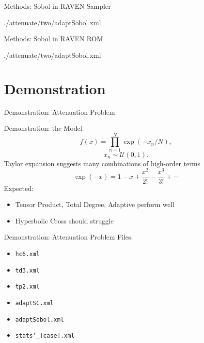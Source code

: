 \documentclass[t,9pt,svgnames]{beamer}
\newcommand{\code}[1]{\texttt{#1}}
\begin{document}
\begin{frame}{Methods: Sobol in RAVEN}
  \vfill
  Sampler
  
          {./attenuate/two/adaptSobol.xml}
  \vfill
\end{frame}

\begin{frame}{Methods: Sobol in RAVEN}
  \vfill
  ROM
  
          {./attenuate/two/adaptSobol.xml}
  \vfill
\end{frame}
%
%
\section{Demonstration}
\begin{frame}{Demonstration: Attenuation Problem}
\end{frame}

\begin{frame}{Demonstration: the Model}
  \vfill
  \begin{equation}
    f(x) = \prod_{n=1}^N \exp(-x_n/N),
  \end{equation}
  \vfill
  \begin{equation}
    x_n \sim \mathcal{U}(0,1).
  \end{equation}
  \vfill
  Taylor expansion suggests many combinations of high-order terms
  \begin{equation}
    \exp(-x) = 1-x+\frac{x^2}{2!}-\frac{x^3}{3!}+\cdots
  \end{equation}
  \vfill
  Expected: 
  \vfill
  \begin{itemize}
  \vfill
    \item Tensor Product, Total Degree, Adaptive perform well
  \vfill
    \item Hyperbolic Cross should struggle
  \end{itemize}
  \vfill
\end{frame}

\begin{frame}{Demonstration: Attenuation Problem}
  \vfill
  Files:
  \vfill
  \begin{itemize}
    \item \code{hc6.xml}
  \vfill
    \item \code{td3.xml}
  \vfill
    \item \code{tp2.xml}
  \vfill
    \item \code{adaptSC.xml}
  \vfill
    \item \code{adaptSobol.xml}
  \vfill
    \item \code{stats\char`_[case].xml}
  \end{itemize}
  \vfill
\end{frame}
\end{document}
